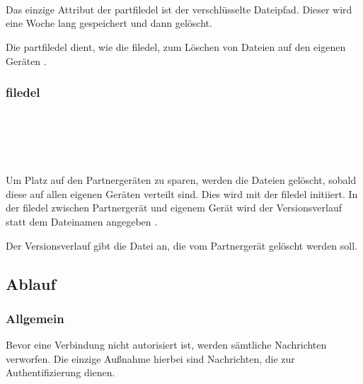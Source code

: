 	\begin{rightwordgroup}{\isprotomsgdata}
		 \\
		\skippedwords \\
		 \\
	\end{rightwordgroup}
\begin{description}
	Das einzige Attribut der \gls{partfiledel} ist der verschlüsselte Dateipfad. Dieser wird eine Woche lang gespeichert und dann gelöscht.
\end{description}
Die \gls{partfiledel} dient, wie die \gls{filedel}, zum Löschen von Dateien auf den eigenen Geräten .

\subsubsection{\gls{filedel}}
\messagestart
	\begin{rightwordgroup}{\isprotomsgtype}
	\end{rightwordgroup}\\
	
	\begin{rightwordgroup}{\isprotomsgdata}
		 \\
		\skippedwords \\
	\end{rightwordgroup}
Um Platz auf den Partnergeräten zu sparen, werden die Dateien gelöscht, sobald diese auf allen eigenen Geräten verteilt sind. Dies wird mit der \gls{filedel} initiiert. In der \gls{filedel} zwischen Partnergerät und eigenem Gerät wird der Versionsverlauf statt dem Dateinamen angegeben .
\begin{description}
	Der Versionsverlauf gibt die Datei an, die vom Partnergerät gelöscht werden soll. 
\end{description}

\subsection{Ablauf}
\subsubsection{Allgemein}
Bevor eine Verbindung nicht autorisiert ist, werden sämtliche Nachrichten verworfen. Die einzige Außnahme hierbei sind Nachrichten, die zur Authentifizierung dienen. 

